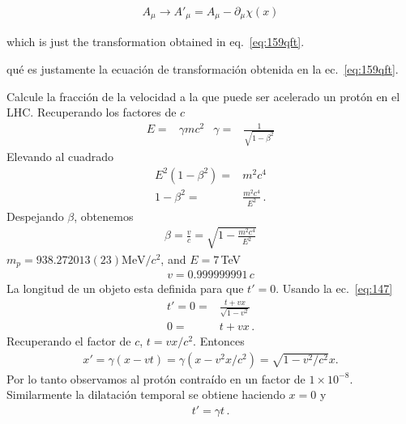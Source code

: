\begin{align}
\label{eq:168qft}
  A_\mu\to A'_\mu=A_\mu-\partial_\mu\chi(x)
\end{align}
\begin{english}
which is just the transformation obtained in eq.~\eqref{eq:159qft}.  
\end{english}
\begin{spanish} %
qué es justamente la ecuación de transformación obtenida en la ec.~\eqref{eq:159qft}.  
\end{spanish}

\begin{frame}
\begin{example}
  Calcule la fracción de la velocidad a la que puede ser acelerado un protón en el LHC.
Recuperando los factores de $c$
  \begin{align*}
  E=&\gamma m c^2&  \gamma=&\frac{1}{\sqrt{1-\beta^2}}
\end{align*}
Elevando al cuadrado
\begin{align}
  E^2(1-\beta^2)=&m^2c^4 \nonumber\\
1-\beta^2=&\frac{m^2c^4}{E^2}\,.
\end{align}
Despejando $\beta$, obtenemos
\begin{align*}
  \beta=\frac{v}{c}=\sqrt{1-\frac{m^2 c^4}{E^2}}
\end{align*}
$m_p=938.272013(23) {\text{MeV}}/{c^2}$, and $E=7\,$TeV
\begin{align*}
  v=0.999999991\,c
\end{align*}
La longitud de un objeto esta definida para que $t'=0$. Usando la ec.~\eqref{eq:147} 
\begin{align}
  t'=0=&\frac{t+vx}{\sqrt{1-v^2}} \nonumber\\
     0=&t+vx\,.
\end{align}
Recuperando el factor de $c$,
 $t=v x/c^2$. Entonces
\begin{align}
  x'=\gamma(x-v t)=\gamma(x-v^2 x/c^2)=\sqrt{1-v^2/c^2}x.
\end{align}
Por lo tanto observamos al protón contraído en un factor de $1\times10^{-8}$.  Similarmente la dilatación temporal se obtiene haciendo $x=0$ y
\begin{align}
  t'=\gamma t\,.
\end{align}
\end{example}

\end{frame}

